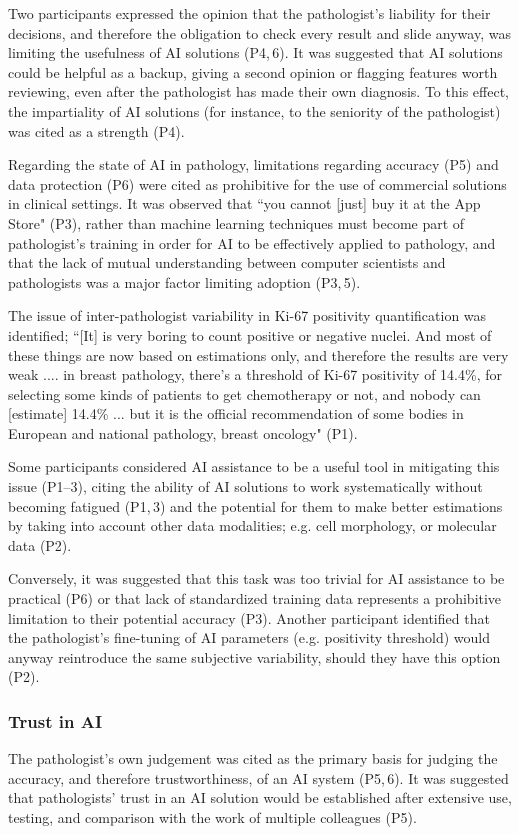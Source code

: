 \documentclass[final,5p,times,twocolumn,hyphens]{elsarticle}
\begin{document}
Two participants expressed the opinion that the pathologist's liability for their decisions, and therefore the obligation to check every result and slide anyway, was limiting the usefulness of AI solutions (P4,\,6). It was suggested that AI solutions could be helpful as a backup, giving a second opinion or flagging features worth reviewing, even after the pathologist has made their own diagnosis. To this effect, the impartiality of AI solutions (for instance, to the seniority of the pathologist) was cited as a strength (P4).

Regarding the state of AI in pathology, limitations regarding accuracy (P5) and data protection (P6) were cited as prohibitive for the use of commercial solutions in clinical settings. It was observed that ``you cannot [just] buy it at the App Store" (P3), rather than machine learning techniques must become part of pathologist's training in order for AI to be effectively applied to pathology, and that the lack of mutual understanding between computer scientists and pathologists was a major factor limiting adoption (P3,\,5).

The issue of inter-pathologist variability in Ki-67 positivity quantification was identified; ``[It] is very boring to count positive or negative nuclei. And most of these things are now based on estimations only, and therefore the results are very weak .... in breast pathology, there's a threshold of Ki-67 positivity of 14.4\%, for selecting some kinds of patients to get chemotherapy or not, and nobody can [estimate] 14.4\% ... but it is the official recommendation of some bodies in European and national pathology, breast oncology" (P1).

Some participants considered AI assistance to be a useful tool in mitigating this issue (P1--3), citing the ability of AI solutions to work systematically without becoming fatigued (P1,\,3) and the potential for them to make better estimations by taking into account other data modalities; e.g. cell morphology, or molecular data (P2).

Conversely, it was suggested that this task was too trivial for AI assistance to be practical (P6) or that lack of standardized training data represents a prohibitive limitation to their potential accuracy (P3). Another participant identified that the pathologist's fine-tuning of AI parameters (e.g. positivity threshold) would anyway reintroduce the same subjective variability, should they have this option (P2).

\subsubsection{Trust in AI}
\label{sec:trustinAI}
The pathologist's own judgement was cited as the primary basis for judging the accuracy, and therefore trustworthiness, of an AI system (P5,\,6). It was suggested that pathologists' trust in an AI solution would be established after extensive use, testing, and comparison with the work of multiple colleagues (P5).
\end{document}
